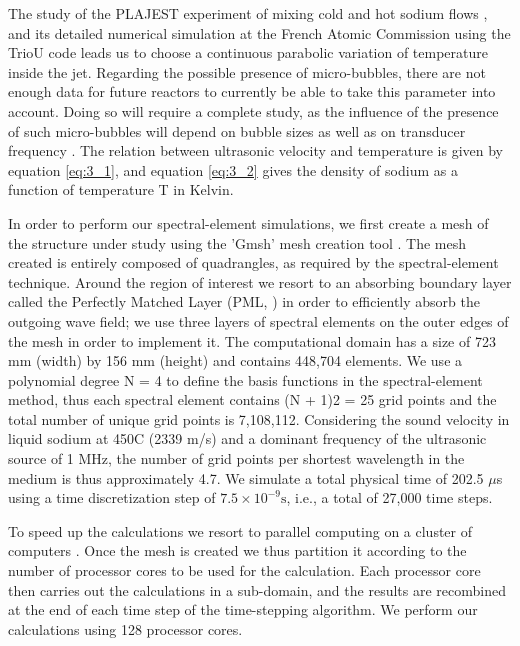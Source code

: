             The study of the PLAJEST experiment of mixing cold and hot sodium flows \parencite{Kimura2007Experimentalinvestigationon}, and its detailed
numerical simulation at the French Atomic Commission using the TrioU code \parencite{Brillant2004Largeeddysimulation} leads us to choose a continuous parabolic
variation of temperature inside the jet. Regarding the possible presence of micro-bubbles, there are not enough data for future reactors to currently be able
to take this parameter into account. Doing so will require a complete study, as the influence of the presence of such micro-bubbles will depend on bubble sizes
as well as on transducer frequency \parencite{Cavaro2011Microbubblecloudcharacterization}. The relation between ultrasonic velocity and temperature is given by
equation \ref{eq:3_1}, and equation \ref{eq:3_2} gives the density of sodium as a function of temperature T in Kelvin.

            In order to perform our spectral-element simulations, we first create a mesh of the structure under study using the 'Gmsh' mesh creation tool
\parencite{Geuzaine2009Gmsh:A3}. The mesh created is entirely composed of quadrangles, as required by the spectral-element technique. Around the region of
interest we resort to an absorbing boundary layer called the Perfectly Matched Layer (PML, \cite{Komatitsch2008Anunsplitconvolutional}) in order to efficiently
absorb the outgoing wave field; we use three layers of spectral elements on the outer edges of the mesh in order to implement it. The computational domain has
a size of 723 mm (width) by 156 mm (height) and contains 448,704 elements. We use a polynomial degree N = 4 to define the basis functions in the
spectral-element method, thus each spectral element contains (N + 1)2 = 25 grid points and the total number of unique grid points is 7,108,112. Considering the
sound velocity in liquid sodium at 450\textdegree{}C (2339 m/s) and a dominant frequency of the ultrasonic source of 1 MHz, the number of grid points per
shortest wavelength in the medium is thus approximately 4.7. We simulate a total physical time of 202.5 $\mu$s using a time discretization step of $7.5 \times
10^{-9} \text{s}$, i.e., a total of 27,000 time steps.

            To speed up the calculations we resort to parallel computing on a cluster of computers \parencite{Peter2011Forwardandadjoint}. Once the mesh is
created we thus partition it according to the number of processor cores to be used for the calculation. Each processor core then carries out the calculations
in a sub-domain, and the results are recombined at the end of each time step of the time-stepping algorithm. We perform our calculations using 128 processor
cores.

